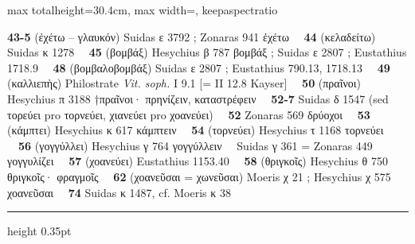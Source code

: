 \documentclass[11pt,twoside]{book}
\newcommand{\italique}[1]{\textit{#1}}
\newcommand{\Eustathe}{Eustathius }
\newcommand{\espTest}{\ {\color{ruleGold}{\policeFr ∥}}\ }
\begin{document}
\begin{adjustbox}{max totalheight=30.4cm, max width=\textwidth, keepaspectratio}
\begin{minipage}{\textwidth}
{ \textbf{43-5} (ἐχέτω -- γλαυκόν) Suidas ε 3792 ; Zonaras 941 ἐχέτω \espTest \textbf{44} (κελαδείτω) Suidas κ 1278 \espTest \textbf{45} (βομβάξ) Hesychius β 787 βομβάξ ; Suidas ε 2807 ; \Eustathe 1718.9 \espTest \textbf{48} (βομβαλοβομβάξ) Suidas ε 2807 ; \Eustathe 790.13, 1718.13 \espTest \textbf{49} (καλλιεπὴς) Philostrate \italique{Vit. soph.} I 9.1 [= II 12.8 Kayser] \espTest \textbf{50} (πραῖνοι) Hesychius π 3188 †πραῖνοι· πρηνίζειν, καταστρέφειν \espTest \textbf{52-7} Suidas δ 1547 (sed τορεύει pro τορνεύει, χιανεύει pro χοανεύει) \espTest \textbf{52} Zonaras 569 δρύοχοι \espTest \textbf{53} (κάμπτει) Hesychius κ 617 κάμπτειν \espTest \textbf{54} (τορνεύει) Hesychius τ 1168 τορνεύει \espTest \textbf{56} (γογγύλλει) Hesychius γ 764 γογγύλλειν \espTest Suidas γ 361 = Zonaras 449 γογγυλίζει \espTest \textbf{57} (χοανεύει) \Eustathe 1153.40 \espTest \textbf{58} (θριγκοῖς) Hesychius θ 750 θριγκοῖς· φραγμοῖς \espTest \textbf{62} (χοανεῦσαι = χωνεῦσαι) Moeris χ 21 ; Hesychius χ 575 χοανεῦσαι \espTest \textbf{74} Suidas κ 1487, cf. Moeris κ 38\par\vspace{2.5pt}
{\color{ruleGold}\hrule height 0.35pt}\vspace{2.5pt}
}
\end{minipage}
\end{adjustbox}
\end{document}
